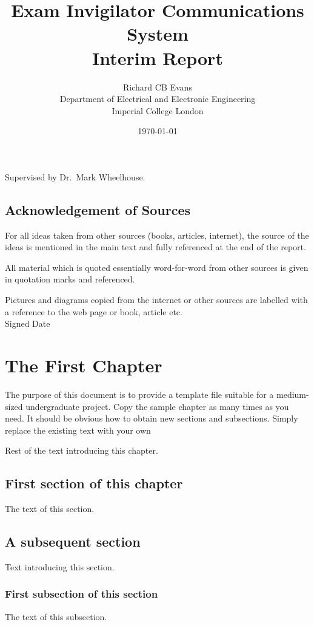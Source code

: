 \documentclass[a4paper, 12pt, notitlepage]{report}
\title{Exam Invigilator Communications System\\
Interim Report} %
\author{Richard CB Evans\\
Department of Electrical and Electronic Engineering\\
Imperial College London} %
\date{\today} %
\begin{document}
\maketitle
\begin{center}
Supervised by Dr.\ Mark Wheelhouse. %
\end{center}
\thispagestyle{empty}
\newpage
\section*{Acknowledgement of Sources} %
For all ideas taken from other sources (books, articles, internet), the source of the ideas is mentioned in the main text and fully referenced at the end of the report.

All material which is quoted essentially word-for-word from other sources is given in quotation marks and referenced.

Pictures and diagrams copied from the internet or other sources are labelled with a reference to the web page or book, article etc.
\\[12pt]
Signed \dotfill Date \dotfill

\tableofcontents 


\chapter{The First Chapter}
%
The purpose of this document is to provide a template file suitable for a medium-sized undergraduate project.
Copy the sample chapter as many times as you need.
It should be obvious how to obtain new sections and subsections.
Simply replace the existing text with your own 

Rest of the text introducing this chapter.

\section{First section of this chapter}
%
The text of this section.

\section{A subsequent section}
%
Text introducing this section.

\subsection{First subsection of this section}
%
The text of this subsection.
\end{document}
